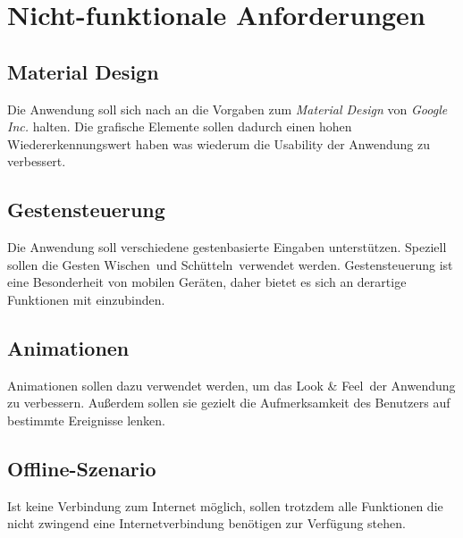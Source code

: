\section{Nicht-funktionale Anforderungen}
\label{sec:nichtfunktionaleanforderungen}

\subsection{Material Design}

Die Anwendung soll sich nach an die Vorgaben zum \textit{Material Design} von \textit{Google Inc.} halten. Die grafische Elemente sollen dadurch einen hohen Wiedererkennungswert haben was wiederum die Usability der Anwendung zu verbessert.

\subsection{Gestensteuerung}

Die Anwendung soll verschiedene gestenbasierte Eingaben unterstützen. Speziell sollen die Gesten \glqq Wischen\grqq\ und \glqq Schütteln\grqq\ verwendet werden. Gestensteuerung ist eine Besonderheit von mobilen Geräten, daher bietet es sich an derartige Funktionen mit einzubinden.

\subsection{Animationen}

Animationen sollen dazu verwendet werden, um das \glqq Look \& Feel\grqq\ der Anwendung zu verbessern. Außerdem sollen sie gezielt die Aufmerksamkeit des Benutzers auf bestimmte Ereignisse lenken.

\subsection{Offline-Szenario}

Ist keine Verbindung zum Internet möglich, sollen trotzdem alle Funktionen die nicht zwingend eine Internetverbindung benötigen zur Verfügung stehen.